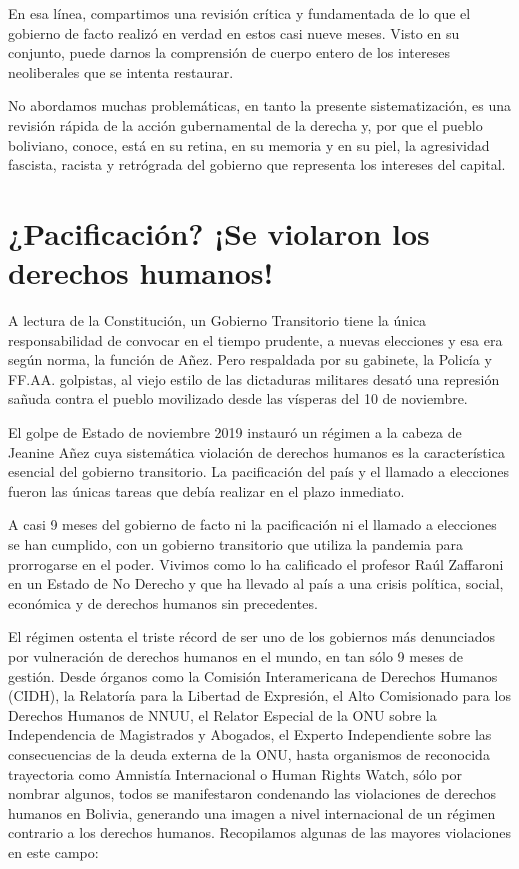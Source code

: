 \documentclass[a4paper, nobind]{templates/ociamthesis}
\begin{document}
En esa línea, compartimos una revisión crítica y fundamentada de lo que el gobierno de facto realizó en verdad en estos casi nueve meses. Visto en su conjunto, puede darnos la comprensión de cuerpo entero de los intereses neoliberales que se intenta restaurar.

No abordamos muchas problemáticas, en tanto la presente sistematización, es una revisión rápida de la acción gubernamental de la derecha y, por que el pueblo boliviano, conoce, está en su retina, en su memoria y en su piel, la agresividad fascista, racista y retrógrada del gobierno que representa los intereses del capital.

\hypertarget{pacificaciuxf3n-se-violaron-los-derechos-humanos}{%
\chapter{¿Pacificación? ¡Se violaron los derechos humanos!}\label{pacificaciuxf3n-se-violaron-los-derechos-humanos}}

A lectura de la Constitución, un Gobierno Transitorio tiene la única responsabilidad de convocar en el tiempo prudente, a nuevas elecciones y esa era según norma, la función de Añez. Pero respaldada por su gabinete, la Policía y FF.AA. golpistas, al viejo estilo de las dictaduras militares desató una represión sañuda contra el pueblo movilizado desde las vísperas del 10 de noviembre.

El golpe de Estado de noviembre 2019 instauró un régimen a la cabeza de Jeanine Añez cuya sistemática violación de derechos humanos es la característica esencial del gobierno transitorio. La pacificación del país y el llamado a elecciones fueron las únicas tareas que debía realizar en el plazo inmediato.

A casi 9 meses del gobierno de facto ni la pacificación ni el llamado a elecciones se han cumplido, con un gobierno transitorio que utiliza la pandemia para prorrogarse en el poder. Vivimos como lo ha calificado el profesor Raúl Zaffaroni en un Estado de No Derecho y que ha llevado al país a una crisis política, social, económica y de derechos humanos sin precedentes.

El régimen ostenta el triste récord de ser uno de los gobiernos más denunciados por vulneración de derechos humanos en el mundo, en tan sólo 9 meses de gestión. Desde órganos como la Comisión Interamericana de Derechos Humanos (CIDH), la Relatoría para la Libertad de Expresión, el Alto Comisionado para los Derechos Humanos de NNUU, el Relator Especial de la ONU sobre la Independencia de Magistrados y Abogados, el Experto Independiente sobre las consecuencias de la deuda externa de la ONU, hasta organismos de reconocida trayectoria como Amnistía Internacional o Human Rights Watch, sólo por nombrar algunos, todos se manifestaron condenando las violaciones de derechos humanos en Bolivia, generando una imagen a nivel internacional de un régimen contrario a los derechos humanos. Recopilamos algunas de las mayores violaciones en este campo:
\end{document}
